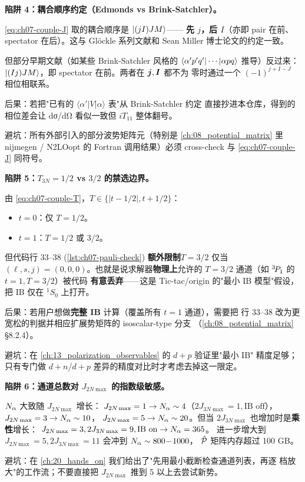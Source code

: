 \begin{pitfallbox}
\textbf{陷阱 4：耦合顺序约定（Edmonds vs Brink-Satchler）。}

\cref{eq:ch07-couple-J} 取的耦合顺序是 \(\ket{(jI)JM}\)——
\textbf{先 \(j\)，后 \(I\)}（亦即 pair 在前、spectator 在后）。这与
Glöckle 系列文献和 Sean Miller 博士论文的约定一致。

但部分早期文献（如某些 Brink-Satchler 风格的
\(\bra{\alpha' p' q'} \cdots \ket{\alpha p q}\) 推导）反过来：
\(\ket{(Ij)JM}\)，即 spectator 在前。两者在 \(\bm{j}, \bm{I}\) 都不为
零时通过一个 \((-1)^{j + I - J}\) 相位相联系。

后果：若把"已有的 \(\langle\alpha'|V|\alpha\rangle\) 表"从 Brink-Satchler 约定
直接抄进本仓库，得到的相位差会让 dσ/dΩ 看似一致但 \(iT_{11}\) 整体翻号。

避坑：所有外部引入的部分波势矩阵元（特别是 \cref{ch:08_potential_matrix}
里 nijmegen / N2LOopt 的 Fortran 调用结果）必须 cross-check 与
\cref{eq:ch07-couple-J} 同符号。
\end{pitfallbox}

\begin{pitfallbox}
\textbf{陷阱 5：\(T_{3N} = 1/2\) vs \(3/2\) 的禁选边界。}

由 \cref{eq:ch07-couple-T}，\(T \in \{|t - 1/2|, t + 1/2\}\)：
\begin{itemize}
  \item \(t = 0\)：仅 \(T = 1/2\)。
  \item \(t = 1\)：\(T = 1/2\) 或 \(3/2\)。
\end{itemize}
但代码行 33--38 (\cref{lst:ch07-pauli-check}) \textbf{额外限制}\(T = 3/2\)
仅当 \((\ell, s, j) = (0, 0, 0)\)。也就是说求解器\textbf{物理上}允许的
\(T = 3/2\) 通道（如 \({}^{3}\!P_{1}\) 的 \(t = 1, T = 3/2\)）被代码
\textbf{有意丢弃}——这是 Tic-tac/origin 的"最小 IB 模型"假设，把 IB
仅在 \({}^1S_0\) 上打开。

后果：若用户想做\textbf{完整 IB} 计算（覆盖所有 \(t = 1\) 通道），需要把
行 33--38 改为更宽松的判据并相应扩展势矩阵的 isoscalar-type 分支
（\cref{ch:08_potential_matrix} \S 8.2.4）。

避坑：在 \cref{ch:13_polarization_observables} 的 \(d+p\) 验证里"最小 IB"
精度足够；只有专门做 \(d+n\)/\(d+p\) 差异的精度对比时才考虑去掉这一限定。
\end{pitfallbox}

\begin{pitfallbox}
\textbf{陷阱 6：通道总数对 \(J_{2N\max}\) 的指数级敏感。}

\(N_\alpha\) 大致随 \(J_{2N\max}\) 增长：
\(J_{2N\max}=1 \to N_\alpha \sim 4\)（\(2J_{3N\max}=1, \text{IB off}\)），
\(J_{2N\max}=3 \to N_\alpha \sim 10\)，
\(J_{2N\max}=5 \to N_\alpha \sim 20\)。但当
\(2J_{3N\max}\) 也增加时是\textbf{乘性}增长：
\(J_{2N\max}=3, 2J_{3N\max}=9, \text{IB on} \to N_\alpha = 365\)。
进一步增大到 \(J_{2N\max}=5, 2J_{3N\max}=11\) 会冲到 \(N_\alpha \sim 800\!-\!1000\)，
\(\hat{\mathcal{P}}\) 矩阵内存超过 100 GB。

避坑：在 \cref{ch:20_hands_on} 我们给出了"先用最小截断检查通道列表，再逐
档放大"的工作流；不要直接把 \(J_{2N\max}\) 推到 5 以上去尝试新势。
\end{pitfallbox}
